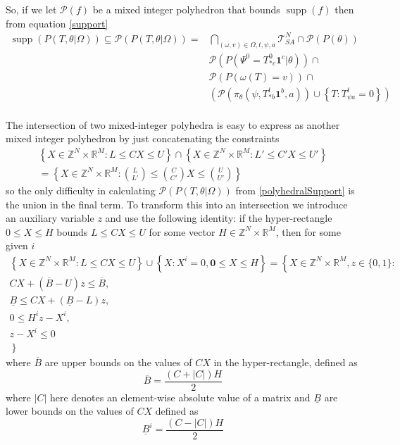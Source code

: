\documentclass{article}
\DeclareMathOperator\supp{supp}
\begin{document}
So, if we let $\mathcal{P}(f)$ be a mixed integer polyhedron that bounds $\supp(f)$ then from equation \eqref{support}
\begin{equation}
\begin{aligned}
\supp(P( T, \theta |\Omega)) \subseteq \mathcal{P}(P(T,\theta|\Omega)) =
& \bigcap_{(\omega,v) \in \Omega,t,\psi, a} \mathcal{T}^N_{SA} \cap \mathcal{P}(P(\theta)) \\
& \mathcal{P}(P(\Psi^0 = T^0_{* c}\mathbf{1}^c|\theta)) \cap\\
&    \mathcal{P}\left(P\left(\omega(T)=v\right)\right) \cap \\
& 
\left(\mathcal{P}\left(\pi_\theta(\psi,T^t_{* b}\mathbf{1}^b,a)\right)
\cup
\left\{T: T^t_{\psi a} = 0\right\}\right)
\\
\end{aligned}
\label{polyhedralSupport}
\end{equation}

The intersection of two mixed-integer polyhedra is easy to express as another mixed integer polyhedron by just concatenating the constraints
\begin{multline}
\left\{ X\in\mathbb{Z}^N \times \mathbb{R}^M : L \le  CX \le U \right\}
\cap
\left\{ X\in\mathbb{Z}^{N} \times \mathbb{R}^{M} : L' \le  C'X \le U' \right\}\\
= \left\{ X\in\mathbb{Z}^{N} \times \mathbb{R}^{M} : {L \choose L'}  \le   {C \choose C'}X \le {U \choose U'} \right\}
\label{intersection}
\end{multline}
so the only difficulty in calculating $\mathcal{P}(P(T,\theta|\Omega))$ from \eqref{polyhedralSupport} is the union in the final term. To transform this into an intersection we introduce an auxiliary variable $z$ and use the following identity: if the hyper-rectangle $0 \le X \le H$ bounds $L \le C X \le U$ for some vector $H \in \mathbb{Z}^N \times \mathbb{R}^M$, then for some given $i$ 
\begin{multline}
\left\{ X\in\mathbb{Z}^N \times \mathbb{R}^M : L \le C X \le U \right\}
\cup
\left\{X: X^i = 0, \mathbf{0} \le X \le H\right\}
= \left\{ \right.X\in\mathbb{Z}^N \times \mathbb{R}^M, z\in\{0,1\}:\\
CX + (\overline{B}-U)z \le \overline{B},\\
\underline{B} \le CX + (\underline{B}-L)z,\\
0 \le H^iz - X^i,\\
 z - X^i \le 0\\
\left. \right\}
\label{implication}
\end{multline}
where $\overline{B}$ are upper bounds on the values of $CX$ in the hyper-rectangle, defined as
\[
\overline{B} = \frac{\left(C+\left|C\right|\right)H}{2}
\]
where $|C|$ here denotes an element-wise absolute value of a matrix and $\underline{B}$ are lower bounds on the values of $CX$ defined as
\[
\underline{B}^i = \frac{\left(C - \left|C\right|\right)H}{2}
\]
\end{document}
